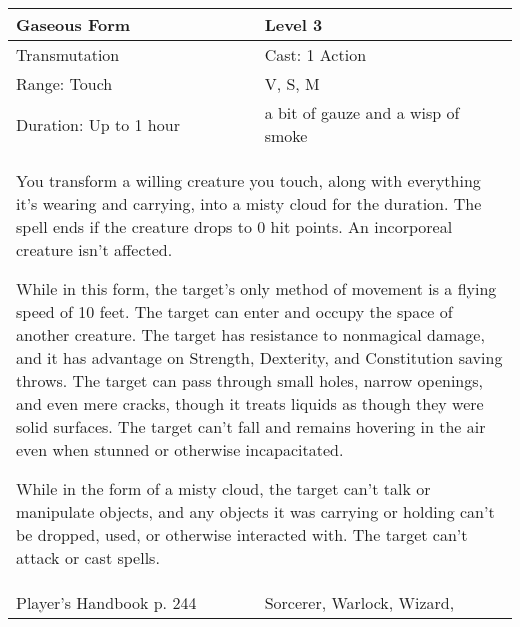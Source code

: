 \documentclass[11pt]{report}
\begin{document}
\begin{table}[H]
	\begin{tabular}{||p{6cm}|p{6cm}||}
		\hline\hline
		\bf{Gaseous Form} & Level 3\\ \hline
		Transmutation & Cast: 1 Action\\ \hline
		Range: Touch & V, S, M\\ \hline
		Duration: Up to 1 hour & a bit of gauze and a wisp of smoke\\ \hline
		\multicolumn{2}{||p{12cm}||}{You transform a willing creature you touch, along with everything it’s wearing and carrying, into a misty cloud for the duration. The spell ends if the creature drops to 0 hit points. An incorporeal creature isn’t affected.

While in this form, the target’s only method of movement is a flying speed of 10 feet. The target can enter and occupy the space of another creature. The target has resistance to nonmagical damage, and it has advantage on Strength, Dexterity, and Constitution saving throws. The target can pass through small holes, narrow openings, and even mere cracks, though it treats liquids as though they were solid surfaces. The target can’t fall and remains hovering in the air even when stunned or otherwise incapacitated.

While in the form of a misty cloud, the target can’t talk or manipulate objects, and any objects it was carrying or holding can’t be dropped, used, or otherwise interacted with. The target can’t attack or cast spells.}\\ \hline
Player's Handbook p. 244 & Sorcerer, Warlock, Wizard, \\ \hline\hline
	\end{tabular}
\end{table}
\end{document}
